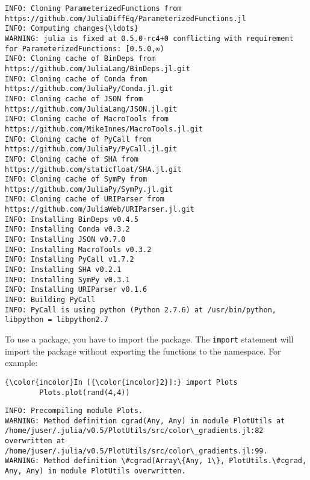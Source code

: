 \documentclass[11pt]{article}
\begin{document}
    \begin{Verbatim}[commandchars=\\\{\}]
INFO: Cloning ParameterizedFunctions from https://github.com/JuliaDiffEq/ParameterizedFunctions.jl
INFO: Computing changes{\ldots}
WARNING: julia is fixed at 0.5.0-rc4+0 conflicting with requirement for ParameterizedFunctions: [0.5.0,∞)
INFO: Cloning cache of BinDeps from https://github.com/JuliaLang/BinDeps.jl.git
INFO: Cloning cache of Conda from https://github.com/JuliaPy/Conda.jl.git
INFO: Cloning cache of JSON from https://github.com/JuliaLang/JSON.jl.git
INFO: Cloning cache of MacroTools from https://github.com/MikeInnes/MacroTools.jl.git
INFO: Cloning cache of PyCall from https://github.com/JuliaPy/PyCall.jl.git
INFO: Cloning cache of SHA from https://github.com/staticfloat/SHA.jl.git
INFO: Cloning cache of SymPy from https://github.com/JuliaPy/SymPy.jl.git
INFO: Cloning cache of URIParser from https://github.com/JuliaWeb/URIParser.jl.git
INFO: Installing BinDeps v0.4.5
INFO: Installing Conda v0.3.2
INFO: Installing JSON v0.7.0
INFO: Installing MacroTools v0.3.2
INFO: Installing PyCall v1.7.2
INFO: Installing SHA v0.2.1
INFO: Installing SymPy v0.3.1
INFO: Installing URIParser v0.1.6
INFO: Building PyCall
INFO: PyCall is using python (Python 2.7.6) at /usr/bin/python, libpython = libpython2.7

    \end{Verbatim}

    To use a package, you have to import the package. The \texttt{import}
statement will import the package without exporting the functions to the
namespace. For example:

    \begin{Verbatim}[commandchars=\\\{\}]
{\color{incolor}In [{\color{incolor}2}]:} import Plots
        Plots.plot(rand(4,4))
\end{Verbatim}

    \begin{Verbatim}[commandchars=\\\{\}]
INFO: Precompiling module Plots.
WARNING: Method definition cgrad(Any, Any) in module PlotUtils at /home/juser/.julia/v0.5/PlotUtils/src/color\_gradients.jl:82 overwritten at /home/juser/.julia/v0.5/PlotUtils/src/color\_gradients.jl:99.
WARNING: Method definition \#cgrad(Array\{Any, 1\}, PlotUtils.\#cgrad, Any, Any) in module PlotUtils overwritten.

    \end{Verbatim}
\end{document}
